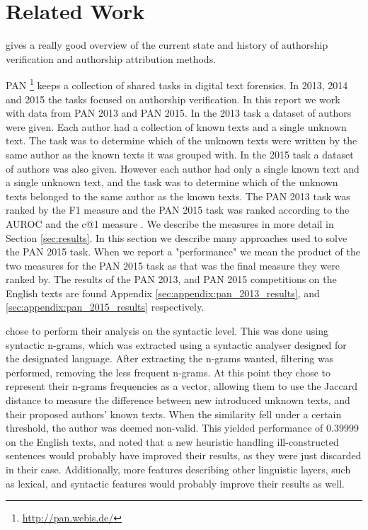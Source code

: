 \section{Related Work} \label{sec:related_work}
\cite{stamatos2009} gives a really good overview of the current state and
history of authorship verification and authorship attribution methods.

PAN \footnote{\url{http://pan.webis.de/}} keeps a collection of shared tasks in
digital text forensics. In 2013, 2014 and 2015 the tasks focused on authorship
verification. In this report we work with data from PAN 2013 and PAN 2015. In
the 2013 task a dataset of authors were given. Each author had a collection of
known texts and a single unknown text. The task was to determine which of the
unknown texts were written by the same author as the known texts it was grouped
with. In the 2015 task a dataset of authors was also given. However each author
had only a single known text and a single unknown text, and the task was to
determine which of the unknown texts belonged to the same author as the known
texts. The PAN 2013 task was ranked by the F1 measure and the PAN 2015 task
was ranked according to the \gls{AUROC} and the c@1 measure \cite{penas2011}.
We describe the measures in more detail in Section \ref{sec:results}. In this
section we describe many approaches used to solve the PAN 2015 task. When we
report a "performance" we mean the product of the two measures for the PAN 2015
task as that was the final measure they were ranked by. The results of the
PAN 2013, and PAN 2015 competitions on the English texts are found Appendix
\ref{sec:appendix:pan_2013_results}, and \ref{sec:appendix:pan_2015_results}
respectively.

\cite{juanpablo2015} chose to perform their analysis on the syntactic level.
This was done using syntactic n-grams, which was extracted using a syntactic
analyser designed for the designated language. After extracting the n-grams
wanted, filtering was performed, removing the less frequent n-grams. At
this point they chose to represent their n-grams frequencies as a vector,
allowing them to use the Jaccard distance to measure the difference between new
introduced unknown texts, and their proposed authors' known texts. When the
similarity fell under a certain threshold, the author was deemed non-valid. This
yielded performance of 0.39999 on the English texts, and \cite{juanpablo2015}
noted that a new heuristic handling ill-constructed sentences would probably
have improved their results, as they were just discarded in their case.
Additionally, more features describing other linguistic layers, such as lexical,
and syntactic features would probably improve their results as well.

